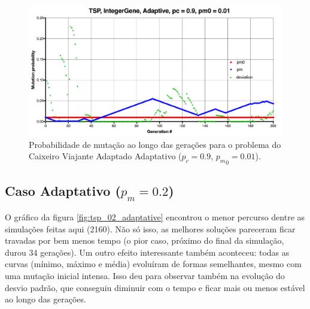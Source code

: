 \begin{figure}[ht!]
    \centering \includegraphics[width=1.0\textwidth]{tsp_001_adaptive_pm.jpg}
    \caption{Probabilidade de mutação ao longo das gerações para o problema do Caixeiro Viajante Adaptado Adaptativo ($p_c=0.9$, ${p_m}_0=0.01$).}
    \label{fig:tsp_001_adaptive_pm}
\end{figure}

\subsection{Caso Adaptativo ($p_m = 0.2$)}

O gráfico da figura \ref{fig:tsp_02_adaptative} encontrou o menor percurso dentre as simulações feitas aqui (2160). Não só isso, as melhores soluções pareceram ficar travadas por bem menos tempo (o pior caso, próximo do final da simulação, durou 34 gerações). Um outro efeito interessante também aconteceu: todas as curvas (mínimo, máximo e média) evoluíram de formas semelhantes, mesmo com uma mutação inicial intensa. Isso deu para observar também na evolução do desvio padrão, que conseguiu diminuir com o tempo e ficar mais ou menos estável ao longo das gerações.

